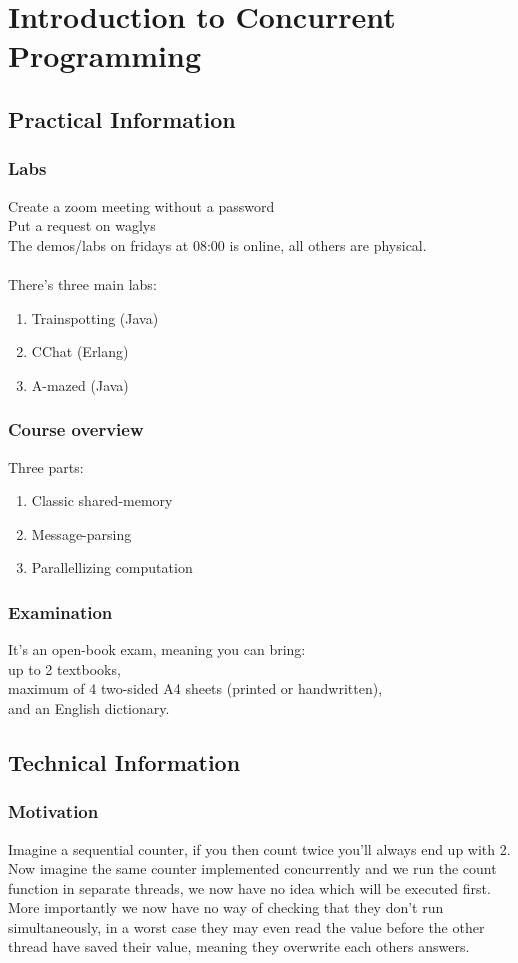 \chapter{Introduction to Concurrent Programming}
\section{Practical Information}
\subsection{Labs}
Create a zoom meeting without a password\\
Put a request on waglys\\
The demos/labs on fridays at 08:00 is online, all others are physical.\\
\\
There's three main labs:
\begin{enumerate}
	\item Trainspotting (Java)
	\item CChat (Erlang)
	\item A-mazed (Java)
\end{enumerate}

\subsection{Course overview}
Three parts:
\begin{enumerate}
	\item Classic shared-memory
	\item Message-parsing
	\item Parallellizing computation
\end{enumerate}

\subsection{Examination}
It's an open-book exam, meaning you can bring:\\
up to 2 textbooks,\\
maximum of 4 two-sided A4 sheets (printed or handwritten),\\
and an English dictionary.
\pagebreak
\section{Technical Information}
\subsection{Motivation}
Imagine a sequential counter, if you then count twice you'll always end up with 2. Now imagine the same counter implemented concurrently and we run the count function in separate threads, we now have no idea which will be executed first. More importantly we now have no way of checking that they don't run simultaneously, in a worst case they may even read the value before the other thread have saved their value, meaning they overwrite each others answers.

